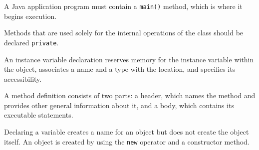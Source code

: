 \begin{SMBL}

\item A Java application program must contain a {\tt main()} method,
which is where it begins execution. 

\item Methods that are used solely for the internal operations of
the class should be declared {\tt private}.

\item  An instance variable declaration reserves memory 
for the instance variable within the object, associates a name and
a type with the location, and specifies its accessibility.

\item  A  method definition consists of two parts: a header, 
which names the method and provides other general information about
it, and a body, which  contains its executable statements.

\item  Declaring a variable creates a name for an object 
but does not create the object itself. An object is created by using
the {\tt new} operator and a constructor method.

\end{SMBL}

